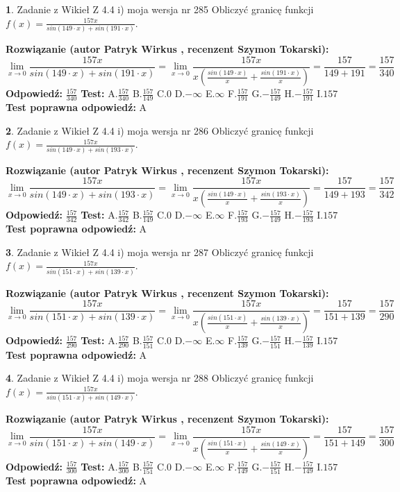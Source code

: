 \documentclass[12pt, a4paper]{article}
\theoremstyle{definition} %
\newtheorem{zad}{}
\newcommand{\zadStart}[1]{\begin{zad}#1\newline}
\newcommand{\zadStop}{\end{zad}}
\newcommand{\rozwStart}[2]{\noindent \textbf{Rozwiązanie (autor #1 , recenzent #2): }\newline}
\newcommand{\rozwStop}{\newline}
\newcommand{\odpStart}{\noindent \textbf{Odpowiedź:}\newline}
\newcommand{\odpStop}{\newline}
\newcommand{\testStart}{\noindent \textbf{Test:}\newline}
\newcommand{\testStop}{\newline}
\newcommand{\kluczStart}{\noindent \textbf{Test poprawna odpowiedź:}\newline}
\newcommand{\kluczStop}{\newline}
\begin{document}
\zadStart{Zadanie z Wikieł Z 4.4 i) moja wersja nr 285}
Obliczyć granicę funkcji $f(x)=\frac{157x}{sin(149\cdot x) +sin(191\cdot x)}$.
\zadStop
\rozwStart{Patryk Wirkus}{Szymon Tokarski}
$$\lim\limits_{x\to 0}\frac{157x}{sin(149\cdot x) +sin(191\cdot x)}=\lim\limits_{x\to 0}\frac{157x}{x(\frac{sin(149\cdot x)}{x}+\frac{sin(191\cdot x)}{x})}=\frac{157}{149+191} = \frac{157}{340}$$
\rozwStop
\odpStart
$\frac{157}{340}$
\odpStop
\testStart
A.$\frac{157}{340}$
B.$\frac{157}{149}$
C.$0$
D.$-\infty$
E.$\infty$
F.$\frac{157}{191}$
G.$-\frac{157}{149}$
H.$-\frac{157}{191}$
I.$157$
\testStop
\kluczStart
A
\kluczStop



\zadStart{Zadanie z Wikieł Z 4.4 i) moja wersja nr 286}
Obliczyć granicę funkcji $f(x)=\frac{157x}{sin(149\cdot x) +sin(193\cdot x)}$.
\zadStop
\rozwStart{Patryk Wirkus}{Szymon Tokarski}
$$\lim\limits_{x\to 0}\frac{157x}{sin(149\cdot x) +sin(193\cdot x)}=\lim\limits_{x\to 0}\frac{157x}{x(\frac{sin(149\cdot x)}{x}+\frac{sin(193\cdot x)}{x})}=\frac{157}{149+193} = \frac{157}{342}$$
\rozwStop
\odpStart
$\frac{157}{342}$
\odpStop
\testStart
A.$\frac{157}{342}$
B.$\frac{157}{149}$
C.$0$
D.$-\infty$
E.$\infty$
F.$\frac{157}{193}$
G.$-\frac{157}{149}$
H.$-\frac{157}{193}$
I.$157$
\testStop
\kluczStart
A
\kluczStop



\zadStart{Zadanie z Wikieł Z 4.4 i) moja wersja nr 287}
Obliczyć granicę funkcji $f(x)=\frac{157x}{sin(151\cdot x) +sin(139\cdot x)}$.
\zadStop
\rozwStart{Patryk Wirkus}{Szymon Tokarski}
$$\lim\limits_{x\to 0}\frac{157x}{sin(151\cdot x) +sin(139\cdot x)}=\lim\limits_{x\to 0}\frac{157x}{x(\frac{sin(151\cdot x)}{x}+\frac{sin(139\cdot x)}{x})}=\frac{157}{151+139} = \frac{157}{290}$$
\rozwStop
\odpStart
$\frac{157}{290}$
\odpStop
\testStart
A.$\frac{157}{290}$
B.$\frac{157}{151}$
C.$0$
D.$-\infty$
E.$\infty$
F.$\frac{157}{139}$
G.$-\frac{157}{151}$
H.$-\frac{157}{139}$
I.$157$
\testStop
\kluczStart
A
\kluczStop



\zadStart{Zadanie z Wikieł Z 4.4 i) moja wersja nr 288}
Obliczyć granicę funkcji $f(x)=\frac{157x}{sin(151\cdot x) +sin(149\cdot x)}$.
\zadStop
\rozwStart{Patryk Wirkus}{Szymon Tokarski}
$$\lim\limits_{x\to 0}\frac{157x}{sin(151\cdot x) +sin(149\cdot x)}=\lim\limits_{x\to 0}\frac{157x}{x(\frac{sin(151\cdot x)}{x}+\frac{sin(149\cdot x)}{x})}=\frac{157}{151+149} = \frac{157}{300}$$
\rozwStop
\odpStart
$\frac{157}{300}$
\odpStop
\testStart
A.$\frac{157}{300}$
B.$\frac{157}{151}$
C.$0$
D.$-\infty$
E.$\infty$
F.$\frac{157}{149}$
G.$-\frac{157}{151}$
H.$-\frac{157}{149}$
I.$157$
\testStop
\kluczStart
A
\kluczStop
\end{document}
